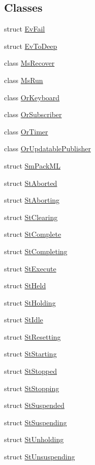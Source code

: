 \subsection*{Classes}
\begin{DoxyCompactItemize}
\item 
struct \hyperlink{structsm__packML_1_1EvFail}{Ev\+Fail}
\item 
struct \hyperlink{structsm__packML_1_1EvToDeep}{Ev\+To\+Deep}
\item 
class \hyperlink{classsm__packML_1_1MsRecover}{Ms\+Recover}
\item 
class \hyperlink{classsm__packML_1_1MsRun}{Ms\+Run}
\item 
class \hyperlink{classsm__packML_1_1OrKeyboard}{Or\+Keyboard}
\item 
class \hyperlink{classsm__packML_1_1OrSubscriber}{Or\+Subscriber}
\item 
class \hyperlink{classsm__packML_1_1OrTimer}{Or\+Timer}
\item 
class \hyperlink{classsm__packML_1_1OrUpdatablePublisher}{Or\+Updatable\+Publisher}
\item 
struct \hyperlink{structsm__packML_1_1SmPackML}{Sm\+Pack\+ML}
\item 
struct \hyperlink{structsm__packML_1_1StAborted}{St\+Aborted}
\item 
struct \hyperlink{structsm__packML_1_1StAborting}{St\+Aborting}
\item 
struct \hyperlink{structsm__packML_1_1StClearing}{St\+Clearing}
\item 
struct \hyperlink{structsm__packML_1_1StComplete}{St\+Complete}
\item 
struct \hyperlink{structsm__packML_1_1StCompleting}{St\+Completing}
\item 
struct \hyperlink{structsm__packML_1_1StExecute}{St\+Execute}
\item 
struct \hyperlink{structsm__packML_1_1StHeld}{St\+Held}
\item 
struct \hyperlink{structsm__packML_1_1StHolding}{St\+Holding}
\item 
struct \hyperlink{structsm__packML_1_1StIdle}{St\+Idle}
\item 
struct \hyperlink{structsm__packML_1_1StResetting}{St\+Resetting}
\item 
struct \hyperlink{structsm__packML_1_1StStarting}{St\+Starting}
\item 
struct \hyperlink{structsm__packML_1_1StStopped}{St\+Stopped}
\item 
struct \hyperlink{structsm__packML_1_1StStopping}{St\+Stopping}
\item 
struct \hyperlink{structsm__packML_1_1StSuspended}{St\+Suspended}
\item 
struct \hyperlink{structsm__packML_1_1StSuspending}{St\+Suspending}
\item 
struct \hyperlink{structsm__packML_1_1StUnholding}{St\+Unholding}
\item 
struct \hyperlink{structsm__packML_1_1StUnsuspending}{St\+Unsuspending}
\end{DoxyCompactItemize}
